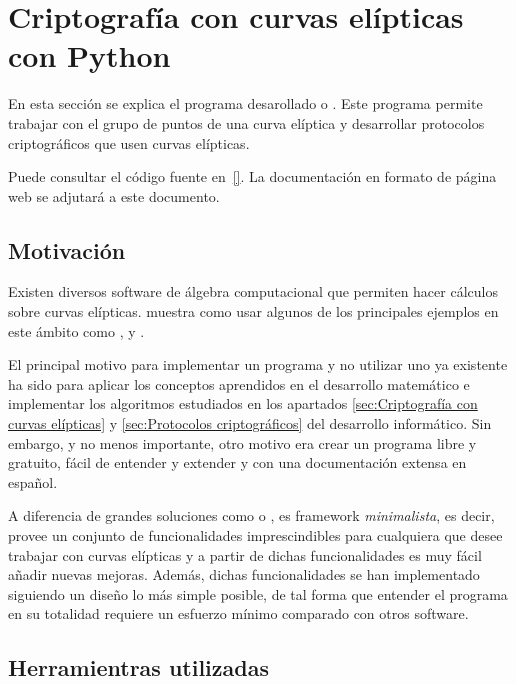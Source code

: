 \section{Criptografía con curvas elípticas con Python}
\label{sec:Criptografía con curvas elípticas con Python}

En esta sección se explica el programa desarollado  o . Este programa permite trabajar con el grupo de puntos de una curva elíptica y desarrollar protocolos criptográficos que usen curvas elípticas.

Puede consultar el código fuente en~\ref{}. La documentación en formato de página web se adjutará a este documento.

\subsection{Motivación}
\label{sub:Motivación}

Existen diversos software de álgebra computacional que permiten hacer cálculos sobre curvas elípticas. \cite{Washington:2008} muestra como usar algunos de los principales ejemplos en este ámbito como ,  y .

El principal motivo para implementar un programa y no utilizar uno ya existente ha sido para aplicar los conceptos aprendidos en el desarrollo matemático e implementar los algoritmos estudiados en los apartados \ref{sec:Criptografía con curvas elípticas} y \ref{sec:Protocolos criptográficos} del desarrollo informático. Sin embargo, y no menos importante, otro motivo era crear un programa libre y gratuito,
fácil de entender y extender y con una documentación extensa en español.

A diferencia de grandes soluciones como  o ,  es framework \emph{minimalista}, es decir, provee un conjunto de funcionalidades imprescindibles para cualquiera que desee trabajar con curvas elípticas y a partir de dichas funcionalidades es muy fácil añadir nuevas mejoras. Además, dichas funcionalidades se han implementado siguiendo un diseño lo más simple posible, de tal forma que entender el programa en su totalidad requiere un esfuerzo mínimo comparado con otros software.

\subsection{Herramientras utilizadas}
\label{sub:Herramientras utilizadas}

